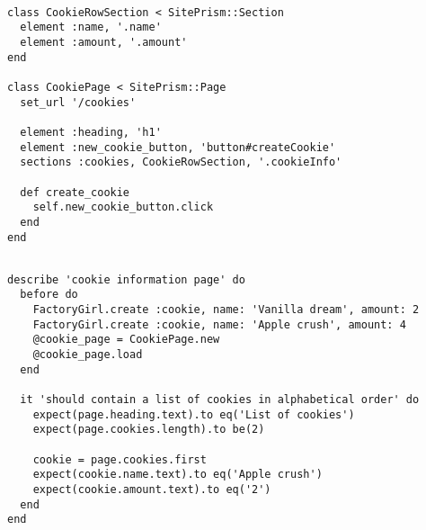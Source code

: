 \begin{lstlisting}[caption=Page definition for a page with a list of cookie information.,
                   label=lst:siteprism_page, float=t]

class CookieRowSection < SitePrism::Section
  element :name, '.name'
  element :amount, '.amount'
end

class CookiePage < SitePrism::Page
  set_url '/cookies'

  element :heading, 'h1'
  element :new_cookie_button, 'button#createCookie'
  sections :cookies, CookieRowSection, '.cookieInfo'

  def create_cookie
    self.new_cookie_button.click
  end
end

\end{lstlisting}

\begin{lstlisting}[caption=Browser test using SitePrism a page object defined in
                           code listing \ref{lst:siteprism_page}.,
                   label=lst:siteprism_test, float=t]

describe 'cookie information page' do
  before do
    FactoryGirl.create :cookie, name: 'Vanilla dream', amount: 2
    FactoryGirl.create :cookie, name: 'Apple crush', amount: 4
    @cookie_page = CookiePage.new
    @cookie_page.load
  end

  it 'should contain a list of cookies in alphabetical order' do
    expect(page.heading.text).to eq('List of cookies')
    expect(page.cookies.length).to be(2)

    cookie = page.cookies.first
    expect(cookie.name.text).to eq('Apple crush')
    expect(cookie.amount.text).to eq('2')
  end
end

\end{lstlisting}
